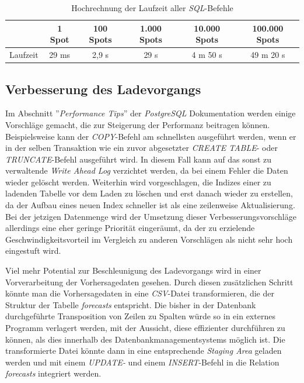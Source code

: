 \begin{table}[h]
  \centering
  {\sf
    \footnotesize
    \begin{longtable}{l|c|c|c|c|c}
      \toprule
       & \textbf{1 Spot} & \textbf{100 Spots} & \textbf{1.000 Spots} & \textbf{10.000 Spots} & \textbf{100.000 Spots} \\
      \midrule
      Laufzeit & 29 ms & 2,9 s & 29 s & 4 m 50 s &  49 m 20 s \\
      \bottomrule
    \end{longtable}
  }

  \caption{Hochrechnung der Laufzeit aller \textit{SQL}-Befehle}
  \label{tab:sql_laufzeit}

\end{table}


\subsection{Verbesserung des Ladevorgangs}
Im Abschnitt ''\textit{Performance Tips}''
\cite{postgresql:performance} der \textit{PostgreSQL} Dokumentation
werden einige Vorschläge gemacht, die zur Steigerung der Performanz
beitragen können. Beispielsweise kann der \textit{COPY}-Befehl am
schnellsten ausgeführt werden, wenn er in der selben Transaktion wie
ein zuvor abgesetzter \textit{CREATE TABLE}- oder
\textit{TRUNCATE}-Befehl ausgeführt wird. In diesem Fall kann auf das
sonst zu verwaltende \textit{Write Ahead Log} verzichtet werden, da
bei einem Fehler die Daten wieder gelöscht werden. Weiterhin wird
vorgeschlagen, die Indizes einer zu ladenden Tabelle vor dem Laden zu
löschen und erst danach wieder zu erstellen, da der Aufbau eines neuen
Index schneller ist als eine zeilenweise Aktualisierung. Bei der
jetzigen Datenmenge wird der Umsetzung dieser Verbesserungsvorschläge
allerdings eine eher geringe Priorität eingeräumt, da der zu
erzielende Geschwindigkeitsvorteil im Vergleich zu anderen Vorschlägen
als nicht sehr hoch eingestuft wird.

Viel mehr Potential zur Beschleunigung des Ladevorgangs wird in einer
Vorverarbeitung der Vorhersagedaten gesehen. Durch diesen zusätzlichen
Schritt könnte man die Vorhersagedaten in eine \textit{CSV}-Datei
transformieren, die der Struktur der Tabelle \textit{forecasts}
entspricht. Die bisher in der Datenbank durchgeführte Transposition
von Zeilen zu Spalten würde so in ein externes Programm verlagert
werden, mit der Aussicht, diese effizienter durchführen zu können, als
dies innerhalb des Datenbankmanagementsystems möglich ist. Die
transformierte Datei könnte dann in eine entsprechende \textit{Staging
  Area} geladen werden und mit einem \textit{UPDATE-} und einem
\textit{INSERT}-Befehl in die Relation \textit{forecasts} integriert
werden. 

